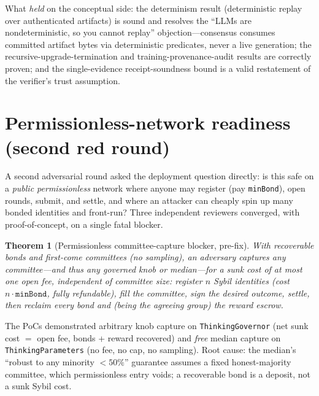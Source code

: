 \documentclass[11pt]{article}
\newtheorem{theorem}{Theorem}
\begin{document}
What \emph{held} on the conceptual side: the determinism result
(deterministic replay over authenticated artifacts) is sound and resolves the
``LLMs are nondeterministic, so you cannot replay'' objection---consensus
consumes committed artifact bytes via deterministic predicates, never a live
generation; the recursive-upgrade-termination and training-provenance-audit
results are correctly proven; and the single-evidence receipt-soundness bound is
a valid restatement of the verifier's trust assumption.

\section{Permissionless-network readiness (second red round)}
\label{sec:permissionless}

A second adversarial round asked the deployment question directly: is this safe on a
\emph{public permissionless} network where anyone may register (pay \texttt{minBond}),
open rounds, submit, and settle, and where an attacker can cheaply spin up many
bonded identities and front-run? Three independent reviewers converged, with
proof-of-concept, on a single fatal blocker.

\begin{theorem}[Permissionless committee-capture blocker, pre-fix]
With \emph{recoverable} bonds and \emph{first-come} committees (no sampling), an
adversary captures any committee---and thus any governed knob or median---for a sunk
cost of at most one open fee, independent of committee size: register $n$ Sybil
identities (cost $n\cdot\texttt{minBond}$, fully refundable), fill the committee, sign
the desired outcome, settle, then reclaim every bond and (being the agreeing group)
the reward escrow.
\end{theorem}

The PoCs demonstrated arbitrary knob capture on \texttt{ThinkingGovernor} (net sunk
cost $=$ open fee, bonds + reward recovered) and \emph{free} median capture on
\texttt{ThinkingParameters} (no fee, no cap, no sampling). Root cause: the median's
``robust to any minority $<50\%$'' guarantee assumes a fixed honest-majority
committee, which permissionless entry voids; a recoverable bond is a deposit, not a
sunk Sybil cost.
\end{document}
